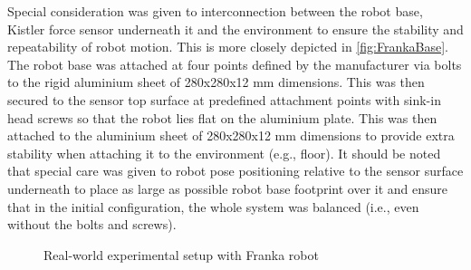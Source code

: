 Special consideration was given to interconnection between the robot base, Kistler force sensor underneath it and the environment to ensure the stability and repeatability of robot motion. This is more closely depicted in \cref{fig:FrankaBase}. The robot base was attached at four points defined by the manufacturer via bolts to the rigid aluminium sheet of 280x280x12 mm dimensions. This was then secured to the sensor top surface at predefined attachment points with sink-in head screws so that the robot lies flat on the aluminium plate. This was then attached to the aluminium sheet of 280x280x12 mm dimensions to provide extra stability when attaching it to the environment (e.g., floor). It should be noted that special care was given to robot pose positioning relative to the sensor surface underneath to place as large as possible robot base footprint over it and ensure that in the initial configuration, the whole system was balanced (i.e., even without the bolts and screws).

\begin{figure}
    \centering
    \hfill
    \caption{Real-world experimental setup with Franka robot}
    \label{fig:FrankaExp}
\end{figure}


